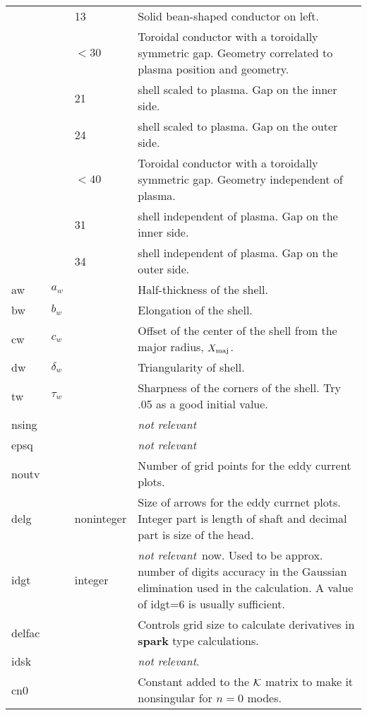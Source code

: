 \documentclass[10pt]{article}
\newcommand{\stylb}[1]{\textbf{#1}}
\newcommand{\notr}{\textsl{not relevant}}
\begin{document}
\begin{center}
\begin{tabular}{|l|l|p{1.0in}|p{3.8in}|}
          &  & 13  & Solid bean-shaped conductor on left.\\

          & & $< 30$ & Toroidal conductor with a toroidally symmetric
          gap.  Geometry correlated to plasma position and geometry. \\

          &       & 21 & shell scaled to plasma. Gap on the inner side.\\
          &       & 24 & shell scaled to plasma. Gap on the outer  side.\\

          & & $< 40$  & Toroidal conductor with a toroidally symmetric
          gap.  Geometry independent of plasma. \\
          
          &       & 31 & shell independent of plasma. Gap on the inner
side.\\
          &       & 34 & shell independent of plasma. Gap on the outer
side.\\

aw        & $a_w$ &  & Half-thickness of the shell.\\

bw        & $b_w$  & & Elongation of the shell.\\

cw        & $c_w$   && Offset of the center of the shell from the major
radius, $X_{\rm maj}$.\\

dw        & $\delta_w$& & Triangularity of shell.\\

tw        & $\tau_w$  && Sharpness of the corners of the shell. Try
.05 as a good initial value.\\

nsing & & & \notr \\

epsq  & &  & \notr \\

noutv & & & Number of grid points for the eddy current plots.\\

delg &  &noninteger & Size of arrows for the eddy currnet
plots. Integer part is length of shaft and decimal part is size of the
head. \\

idgt & & integer & \notr\ now. Used to be approx. number of digits
accuracy in the Gaussian elimination used in the calculation. A value
of idgt=6 is usually sufficient.\\

delfac & & & Controls grid size to calculate derivatives in
\stylb{spark} type calculations. \\

idsk & & & \notr.\\

cn0 & & & Constant added to the $\cal K$ matrix to make it nonsingular for
$n=0$ modes. \\
\hline
\end{tabular}
\end{center}
\end{document}
